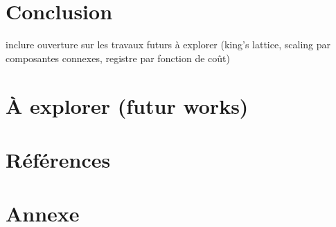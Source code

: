 \documentclass[11pt]{article}
\begin{document}
\section{Conclusion}
inclure ouverture sur les travaux futurs à explorer (king's lattice\cite{kim_quantum_2023}, scaling par composantes connexes\cite{chung_connected_2002}, registre par fonction de coût)
\section{À explorer (futur works)}

\section{Références}
\printbibliography[heading=none]

\section{Annexe}
\end{document}
